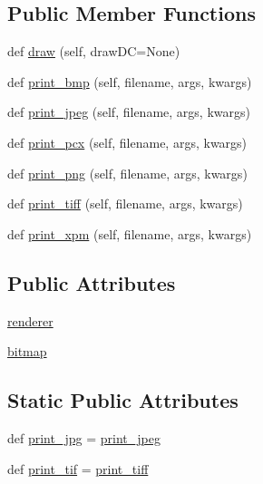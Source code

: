 \subsection*{Public Member Functions}
\begin{DoxyCompactItemize}
\item 
def \hyperlink{classmatplotlib_1_1backends_1_1backend__wx_1_1FigureCanvasWx_a33b486e1f4f28e064ddcfccd3cbf70b5}{draw} (self, draw\+DC=None)
\item 
def \hyperlink{classmatplotlib_1_1backends_1_1backend__wx_1_1FigureCanvasWx_a534151dc1849ca6903761c86c9d92993}{print\+\_\+bmp} (self, filename, args, kwargs)
\item 
def \hyperlink{classmatplotlib_1_1backends_1_1backend__wx_1_1FigureCanvasWx_a741541d3aceebd35aa9d2f98414aa883}{print\+\_\+jpeg} (self, filename, args, kwargs)
\item 
def \hyperlink{classmatplotlib_1_1backends_1_1backend__wx_1_1FigureCanvasWx_a59ef8acddc62ba321bb79a4a7f0b21be}{print\+\_\+pcx} (self, filename, args, kwargs)
\item 
def \hyperlink{classmatplotlib_1_1backends_1_1backend__wx_1_1FigureCanvasWx_a2a5762f1bc2a0ab65c2bb07c0272ef77}{print\+\_\+png} (self, filename, args, kwargs)
\item 
def \hyperlink{classmatplotlib_1_1backends_1_1backend__wx_1_1FigureCanvasWx_afea2030c3d201024e4da4b4c7213af2a}{print\+\_\+tiff} (self, filename, args, kwargs)
\item 
def \hyperlink{classmatplotlib_1_1backends_1_1backend__wx_1_1FigureCanvasWx_aea2bea597a653abc7e3a941513f8e9b7}{print\+\_\+xpm} (self, filename, args, kwargs)
\end{DoxyCompactItemize}
\subsection*{Public Attributes}
\begin{DoxyCompactItemize}
\item 
\hyperlink{classmatplotlib_1_1backends_1_1backend__wx_1_1FigureCanvasWx_aae305e89b6dcb07bdc7869d17202d930}{renderer}
\item 
\hyperlink{classmatplotlib_1_1backends_1_1backend__wx_1_1FigureCanvasWx_a16600e145dcce41e8f6f15d58edc79ae}{bitmap}
\end{DoxyCompactItemize}
\subsection*{Static Public Attributes}
\begin{DoxyCompactItemize}
\item 
def \hyperlink{classmatplotlib_1_1backends_1_1backend__wx_1_1FigureCanvasWx_a06dd0e59010f7ceb89934be388e2c8bf}{print\+\_\+jpg} = \hyperlink{classmatplotlib_1_1backends_1_1backend__wx_1_1FigureCanvasWx_a741541d3aceebd35aa9d2f98414aa883}{print\+\_\+jpeg}
\item 
def \hyperlink{classmatplotlib_1_1backends_1_1backend__wx_1_1FigureCanvasWx_a77cd824b92569445e18bde88ac030215}{print\+\_\+tif} = \hyperlink{classmatplotlib_1_1backends_1_1backend__wx_1_1FigureCanvasWx_afea2030c3d201024e4da4b4c7213af2a}{print\+\_\+tiff}
\end{DoxyCompactItemize}


